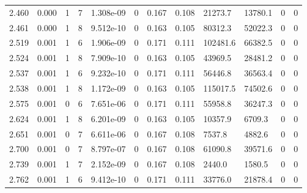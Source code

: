 \documentclass[preview]{standalone}
\begin{document}
{{\begin{tabular}{L{1.2cm}C{1.2cm} C{0.3cm}C{0.5cm} C{1.4cm}C{1.4cm} C{1.4cm}C{1.4cm} C{1.6cm}C{1.6cm} C{1.6cm}C{1.6cm}}
  2.460  &  0.000  & 1     &  7 &  1.308e-09  & 0  &  0.167&   0.108& 21273.7 & 13780.1   &  0 & 0  \\ 
  2.461  &  0.000  & 1     &  8 &  9.512e-10  & 0  &  0.163&   0.105& 80312.3 & 52022.3   &  0 & 0  \\ 
  2.519  &  0.001  & 1     &  6 &  1.906e-09  & 0  &  0.171&   0.111& 102481.6 & 66382.5   &  0 & 0  \\ 
  2.524  &  0.001  & 1     &  8 &  7.909e-10  & 0  &  0.163&   0.105& 43969.5 & 28481.2   &  0 & 0  \\ 
  2.537  &  0.001  & 1     &  6 &  9.232e-10  & 0  &  0.171&   0.111& 56446.8 & 36563.4   &  0 & 0  \\ 
  2.538  &  0.001  & 1     &  8 &  1.172e-09  & 0  &  0.163&   0.105& 115017.5 & 74502.6   &  0 & 0  \\ 
  2.575  &  0.001  & 0     &  6 &  7.651e-06  & 0  &  0.171&   0.111& 55958.8 & 36247.3   &  0 & 0  \\ 
  2.624  &  0.001  & 1     &  8 &  6.201e-09  & 0  &  0.163&   0.105& 10357.9 & 6709.3   &  0 & 0  \\ 
  2.651  &  0.001  & 0     &  7 &  6.611e-06  & 0  &  0.167&   0.108& 7537.8 & 4882.6   &  0 & 0  \\ 
  2.700  &  0.001  & 0     &  7 &  8.797e-07  & 0  &  0.167&   0.108& 61090.8 & 39571.6   &  0 & 0  \\ 
  2.739  &  0.001  & 1     &  7 &  2.152e-09  & 0  &  0.167&   0.108& 2440.0 & 1580.5   &  0 & 0  \\ 
  2.762  &  0.001  & 1     &  6 &  9.412e-10  & 0  &  0.171&   0.111& 33776.0 & 21878.4   &  0 & 0  \\ 
\hline 
\end{tabular} 

}}
\end{document}
